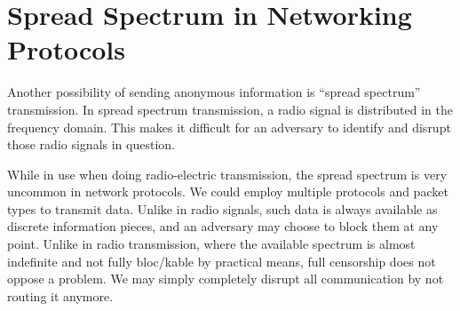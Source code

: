 \section{Spread Spectrum in Networking Protocols}
Another possibility of sending anonymous information is ``spread spectrum'' transmission. In spread spectrum transmission, a radio signal is distributed in the frequency domain. This makes it difficult for an adversary to identify and disrupt those radio signals in question. 

While in use when doing radio-electric transmission, the spread spectrum is very uncommon in network protocols. We could employ multiple protocols and packet types to transmit data. Unlike in radio signals, such data is always available as discrete information pieces, and an adversary may choose to block them at any point. Unlike in radio transmission, where the available spectrum is almost indefinite and not fully bloc/kable by practical means, full censorship does not oppose a problem. We may simply completely disrupt all communication by not routing it anymore.
